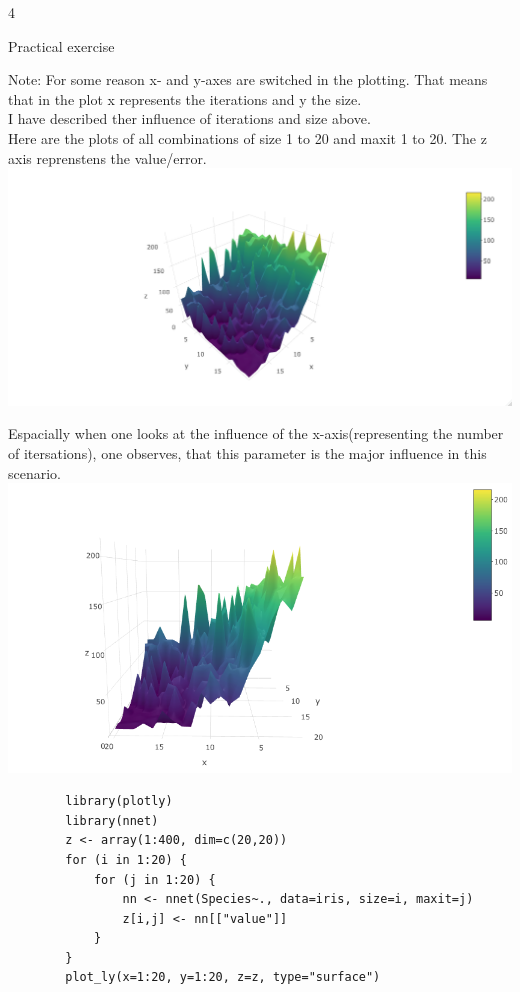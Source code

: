 \documentclass{article}
\begin{document}
\begin{ukon-infie}[22.11.17]{4}
\begin{exercise}[p=7+2]{Practical exercise}
		\question{}
		{
		Note: For some reason x- and y-axes are switched in the plotting. That means that in the plot x represents the iterations and y the size.\\
		I have described ther influence of iterations and size above.\\
		Here are the plots of all combinations of size 1 to 20 and maxit 1 to 20. The z axis reprenstens the value/error.\\
		\includegraphics[scale=0.5]{Rplot_nn_iter_size}
		
		Espacially when one looks at the influence of the x-axis(representing the number of itersations), one observes, that this parameter is the major influence in this scenario. \\
		\includegraphics[scale=0.5]{Rplot_nn_iter_size_x}

		}
		\begin{verbatim}
		library(plotly)
		library(nnet)
		z <- array(1:400, dim=c(20,20))
		for (i in 1:20) {
    		for (j in 1:20) {
        		nn <- nnet(Species~., data=iris, size=i, maxit=j)
        		z[i,j] <- nn[["value"]]
    		}
		}
		plot_ly(x=1:20, y=1:20, z=z, type="surface")
		\end{verbatim}

		\end{exercise}
		
		
\end{ukon-infie}
\end{document}
